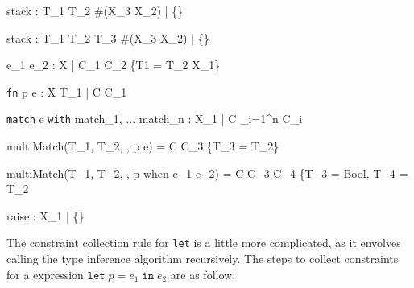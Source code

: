 \documentclass{article}
\begin{document}
    {\Gamma \vdash stack : T_1 \rightarrow T_2 \rightarrow \#(X_3 \rightarrow X_2)  \; | \; \{\}}

    {\Gamma \vdash stack : T_1 \rightarrow T_2 \rightarrow T_3 \rightarrow \#(X_3 \rightarrow X_2)  \; | \; \{\}}

    {\Gamma \vdash e_1 \; e_2 : X \; | \; C_1 \cup C_2 \cup \{T1 = T_2 \rightarrow X_1\}}

    {\Gamma \vdash \texttt{fn} \; p \Rightarrow e : X \rightarrow T_1 \; | \; C \cup C_1}

    {\Gamma \vdash \texttt{match} \; e \; \texttt{with} \; match_1, ... \; match_n : X_1 \; | \; C \cup \displaystyle \bigcup_{i=1}^{n} C_i}

  {multiMatch(T_1, T_2, \Gamma, p \rightarrow e) = C \cup C_3 \cup \{T_3 = T_2\}}

  {multiMatch(T_1, T_2, \Gamma, p \; \mbox{when} \; e_1 \rightarrow e_2) = C \cup C_3 \cup C_4 \cup \{T_3 = Bool, T_4 = T_2}

    {\Gamma \vdash raise : X_1 \; | \; \{\}}

The constraint collection rule for \texttt{let} is a little more complicated, as it envolves calling the type inference algorithm recursively.
The steps to collect constraints for a expression $\texttt{let} \; p = e_1 \; \texttt{in} \; e_2$ are as follow:
\end{document}
